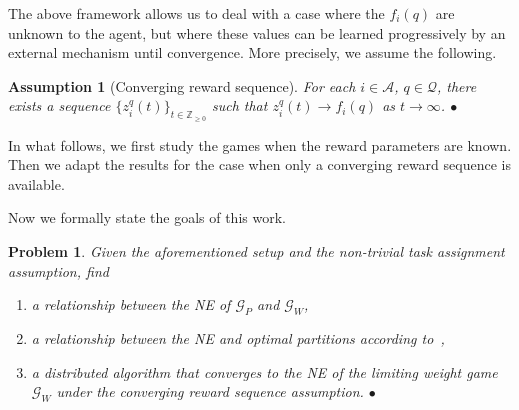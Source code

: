 \documentclass{IEEEtran}
\newcommand{\Mcal}[1]{\mathcal{#1}}
\newcommand{\Mc}[1]{\mathcal{#1}}
\newcommand{\thmtitle}[1]{\mbox{}\emph{(#1).}}
\newtheorem{problem}[theorem]{Problem}
\newtheorem{assume}[theorem]{Assumption}
\newcommand{\integer}{\ensuremath{\mathbb{Z}}}
\newcommand{\bulletsym}{\hbox{$\bullet$}}
\newcommand{\bulletend}{\relax\ifmmode\else\unskip\hfill\fi\bulletsym}
\newcommand{\marginn}[1]{\marginpar{\color{blue}\tiny\ttfamily#1}}
\newcommand{\margin}[1]{\marginpar{\color{magenta}\tiny\ttfamily#1}}
\def \agt{\Mcal{A}}
\def \fseq{z}
\def \game{\mathscr{G}}
\def \integer{\mathbb{Z}}
\def \intpos{\integer_{\geq 0}}
\def \rf{r}
\def \tsk{\Mc{Q}}
\begin{document}
The above framework allows us to deal with a case where the $f_i(q)$
are unknown to the agent, but where these values can be learned
progressively by an external mechanism until convergence. More
precisely, we assume the following. 
\begin{assume}[Converging reward sequence]\label{asmp:convering_seq_reward}
For each $i \in \agt$, $q \in \tsk$, there exists a sequence $\{\fseq^q_i(t)\}_{t \in \intpos}$ such that $\fseq^q_i(t) \to f_i(q)$ as $t \to \infty$.
\bulletend
\end{assume} 
In what follows, we first study the games when the reward parameters
are known. Then we adapt the results for the case when only a
converging reward sequence is available.

Now we formally state the goals of this work.
\begin{problem}\label{prob:main}
  Given the aforementioned setup and %
  the non-trivial task assignment assumption,  find
\begin{enumerate}
	\item \label{prob:relate_nep_neg} a relationship between the NE of $\game_P$ and $\game_W$,
	\item \label{prob:relate_ne_opt} a relationship between the NE and optimal partitions according to~,
	\item \label{prob:dist_ne_algo} a  distributed algorithm that converges to the NE of the limiting weight game $\game_W$ under the converging reward sequence assumption. 
\bulletend
\end{enumerate}
\end{problem}
 
\end{document}
